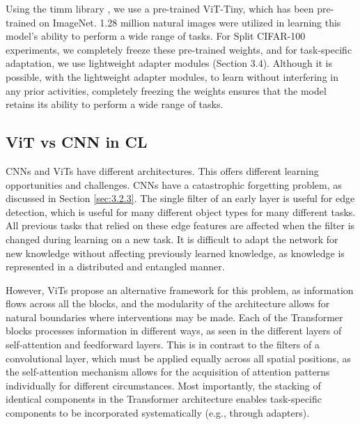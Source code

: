 \documentclass[english, LaM, oneside]{sapthesis}%
\numberwithin{equation}{chapter}
\begin{document}
Using the timm library\cite{31} , we use a pre-trained ViT-Tiny, which has been pre-trained on ImageNet. 1.28 million natural images were utilized in learning this model's ability to perform a wide range of tasks. For Split CIFAR-100 experiments, we completely freeze these pre-trained weights, and for task-specific adaptation, we use lightweight adapter modules (Section 3.4). Although it is possible, with the lightweight adapter modules, to learn without interfering in any prior activities, completely freezing the weights ensures that the model retains its ability to perform a wide range of tasks.

\subsection{ViT vs CNN in CL}
CNNs and ViTs have different architectures. This offers different learning opportunities and challenges. CNNs have a catastrophic forgetting problem, as discussed in Section \ref{sec:3.2.3}. The single filter of an early layer is useful for edge detection, which is useful for many different object types for many different tasks. All previous tasks that relied on these edge features are affected when the filter is changed during learning on a new task. It is difficult to adapt the network for new knowledge without affecting previously learned knowledge, as knowledge is represented in a distributed and entangled manner.

However, ViTs propose an alternative framework for this problem, as information flows across all the blocks, and the modularity of the architecture allows for natural boundaries where interventions may be made\cite{4}\cite{5}. Each of the Transformer blocks processes information in different ways, as seen in the different layers of self-attention and feedforward layers. This is in contrast to the filters of a convolutional layer, which must be applied equally across all spatial positions, as the self-attention mechanism allows for the acquisition of attention patterns individually for different circumstances. Most importantly, the stacking of identical components in the Transformer architecture enables task-specific components to be incorporated systematically (e.g., through adapters).
\end{document}
